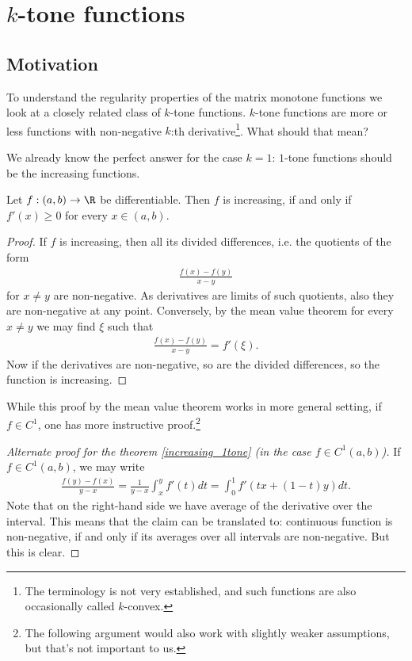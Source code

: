 \chapter{$k$-tone functions}

\section{Motivation}

To understand the regularity properties of the matrix monotone functions we look at a closely related class of $k$-tone functions. $k$-tone functions are more or less functions with non-negative $k$:th derivative\footnote{The terminology is not very established, and such functions are also occasionally called $k$-convex.}. What should that mean?

We already know the perfect answer for the case $k = 1$: $1$-tone functions should be the increasing functions.

\begin{lause}\label{increasing_1tone}
	Let $f : (a, b) \to \R$ be differentiable. Then $f$ is increasing, if and only if $f'(x) \geq 0$ for every $x \in (a, b)$.
\end{lause}

\begin{proof}
	If $f$ is increasing, then all its divided differences, i.e. the quotients of the form
	\begin{align*}
		\frac{f(x) - f(y)}{x - y}
	\end{align*}
	for $x \neq y$ are non-negative. As derivatives are limits of such quotients, also they are non-negative at any point. Conversely, by the mean value theorem for every $x \neq y$ we may find $\xi$ such that
	\begin{align*}
		\frac{f(x) - f(y)}{x - y} = f'(\xi).
	\end{align*}
	Now if the derivatives are non-negative, so are the divided differences, so the function is increasing.
\end{proof}

While this proof by the mean value theorem works in more general setting, if $f \in C^{1}$, one has more instructive proof.\footnote{The following argument would also work with slightly weaker assumptions, but that's not important to us.}

\begin{proof}[Alternate proof for the theorem \ref{increasing_1tone} (in the case $f \in C^{1}(a, b)$)]
	If $f \in C^{1}(a, b)$, we may write
	\begin{align*}
		\frac{f(y) - f(x)}{y - x} = \frac{1}{y - x}\int_{x}^{y} f'(t) dt = \int_{0}^{1} f'(t x + (1 - t) y) dt.
	\end{align*}
	Note that on the right-hand side we have average of the derivative over the interval. This means that the claim can be translated to: continuous function is non-negative, if and only if its averages over all intervals are non-negative. But this is clear.
\end{proof}

